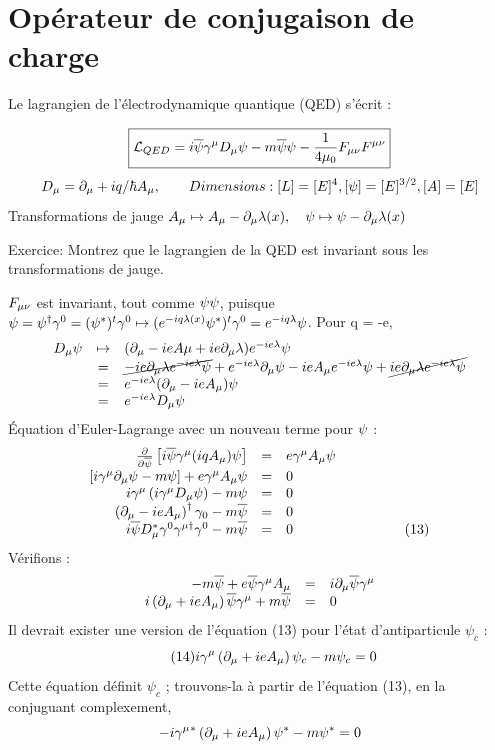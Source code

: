 \section{Opérateur de conjugaison de charge}
Le lagrangien de l’électrodynamique quantique (QED) s’écrit :

\[
\boxed{\mathcal{L}_{QED}=i\overline{\psi}\gamma^\mu D_\mu\psi -m\overline{\psi}\psi
-\frac{1}{4\mu_0}F_{\mu\nu}F^{\mu\nu} }
\]
\[
D_\mu=\partial_\mu+iq/\hbar A_\mu,\qquad Dimensions : [L]=[E]^4,[\psi]=[E]^{3/2},[A]=[E]
\]
Transformations de jauge $A_\mu\mapsto A_\mu-\partial_\mu\lambda(x),\quad \psi\mapsto\psi-\partial_\mu\lambda(x)$

Exercice: Montrez que le lagrangien de la QED est invariant sous les
transformations de jauge.

$F_{\mu\nu}$ est invariant, tout comme $\psi\psi$, puisque
$\psi=\psi^\dagger\gamma^0=(\psi^*)^t\gamma^0\mapsto(e^{-iq\lambda(x)}\psi^*)^t\gamma^0=e^{-iq\lambda}\psi$. Pour q = -e,
\[
\begin{array}{ r c l }
 D_\mu\psi & \mapsto & (\partial_\mu-ieA\mu+ie\partial_\mu\lambda)e^{-ie\lambda}\psi \\ & = & 
\cancel{-ie\partial_\mu\lambda e^{-ie\lambda}\psi}+e^{-ie\lambda}\partial_\mu\psi-ieA_\mu e^{-ie\lambda}\psi+\cancel{ie\partial_\mu\lambda e^{-ie\lambda}\psi}\\
  & = & e^{-ie\lambda}(\partial_\mu-ieA_\mu)\psi \\
  & = &  e^{-ie\lambda}D_\mu\psi\\
\end{array}
\]
Équation d’Euler-Lagrange avec un nouveau terme pour $\psi$ :
\[
\begin{array}{ r c l }
\frac{\partial}{\partial\overline{\psi}}\left[i\overline{\psi}\gamma^\mu(iqA_\mu)\psi\right]
 & = & e\gamma^\mu A_\mu\psi \\
\left[i\gamma^\mu\partial_\mu\psi-m\psi\right]+e\gamma^\mu A_\mu\psi & = & 0 \\
i\gamma^\mu\left(i\gamma^\mu D_\mu\psi \right) -m\psi & = & 0 \\
\left(\partial_\mu-ieA_\mu \right)^\dagger\gamma_0 -m\overline{\psi} & = & 0 \\
i\overline{\psi} D_\mu^*\gamma^0\gamma^{\mu\dagger}\gamma^0 -m\overline{\psi} & = & 0 \qquad \qquad \qquad \qquad (13)\\
\end{array}
\]
Vérifions :
\[
\begin{array}{ r c l }
-m\overline{\psi}+e\overline{\psi}\gamma^\mu A_\mu & = & i\partial_\mu\overline{\psi}\gamma^\mu \\
i\left(\partial_\mu+ieA_\mu\right)\overline{\psi}\gamma^\mu+m\overline{\psi} & = & 0 \\
\end{array}
\]
Il devrait exister une version de l’équation (13) pour l’état d’antiparticule $\psi_c$ :
\[
\tag{14}i\gamma^\mu\left(\partial_\mu+ieA_\mu\right)\psi_c-m\psi_c=0
\]
Cette équation définit $\psi_c$ ; trouvons-la à partir de l’équation (13), en la conjuguant complexement,
\[
-i\gamma^\mu{^*}\left(\partial_\mu+ieA_\mu\right)\psi^*-m\psi^*=0
\]

